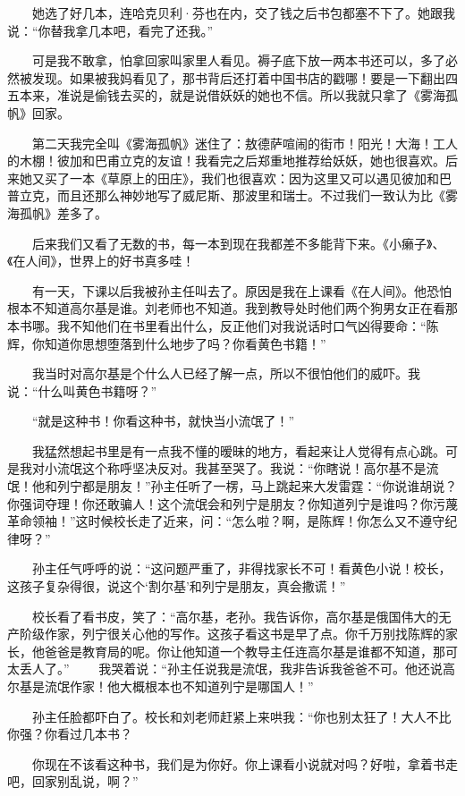  　　她选了好几本，连哈克贝利·芬也在内，交了钱之后书包都塞不下了。她跟我说：“你替我拿几本吧，看完了还我。” 
 
 　　可是我不敢拿，怕拿回家叫家里人看见。褥子底下放一两本书还可以，多了必然被发现。如果被我妈看见了，那书背后还打着中国书店的戳哪！要是一下翻出四五本来，准说是偷钱去买的，就是说借妖妖的她也不信。所以我就只拿了《雾海孤帆》回家。 
 
 　　第二天我完全叫《雾海孤帆》迷住了：敖德萨喧闹的街市！阳光！大海！工人的木棚！彼加和巴甫立克的友谊！我看完之后郑重地推荐给妖妖，她也很喜欢。后来她又买了一本《草原上的田庄》，我们也很喜欢：因为这里又可以遇见彼加和巴普立克，而且还那么神妙地写了威尼斯、那波里和瑞士。不过我们一致认为比《雾海孤帆》差多了。 
 
 　　后来我们又看了无数的书，每一本到现在我都差不多能背下来。《小癞子》、《在人间》，世界上的好书真多哇！ 
 
 　　有一天，下课以后我被孙主任叫去了。原因是我在上课看《在人间》。他恐怕根本不知道高尔基是谁。刘老师也不知道。我到教导处时他们两个狗男女正在看那本书哪。我不知他们在书里看出什么，反正他们对我说话时口气凶得要命：“陈辉，你知道你思想堕落到什么地步了吗？你看黄色书籍！” 
 
 　　我当时对高尔基是个什么人已经了解一点，所以不很怕他们的威吓。我说：“什么叫黄色书籍呀？” 
 
 　　“就是这种书！你看这种书，就快当小流氓了！” 
 
 　　我猛然想起书里是有一点我不懂的暧昧的地方，看起来让人觉得有点心跳。可是我对小流氓这个称呼坚决反对。我甚至哭了。我说：“你瞎说！高尔基不是流氓！他和列宁都是朋友！”孙主任听了一楞，马上跳起来大发雷霆：“你说谁胡说？你强词夺理！你还敢骗人！这个流氓会和列宁是朋友？你知道列宁是谁吗？你污蔑革命领袖！”这时候校长走了近来，问：“怎么啦？啊，是陈辉！你怎么又不遵守纪律呀？” 
 
 　　孙主任气呼呼的说：“这问题严重了，非得找家长不可！看黄色小说！校长，这孩子复杂得很，说这个‘割尔基’和列宁是朋友，真会撒谎！” 
 
 　　校长看了看书皮，笑了：“高尔基，老孙。我告诉你，高尔基是俄国伟大的无产阶级作家，列宁很关心他的写作。这孩子看这书是早了点。你千万别找陈辉的家长，他爸爸是教育局的呢。你让他知道一个教导主任连高尔基是谁都不知道，那可太丢人了。” 　　我哭着说：“孙主任说我是流氓，我非告诉我爸爸不可。他还说高尔基是流氓作家！他大概根本也不知道列宁是哪国人！” 
 
 　　孙主任脸都吓白了。校长和刘老师赶紧上来哄我：“你也别太狂了！大人不比你强？你看过几本书？ 
 
 　　你现在不该看这种书，我们是为你好。你上课看小说就对吗？好啦，拿着书走吧，回家别乱说，啊？” 
 
